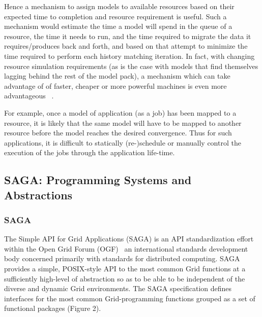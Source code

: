 \documentclass{sig-alternate}
\begin{document}
Hence a mechanism to assign models to available resources based on
their expected time to completion and resource requirement is useful.
Such a mechanism would estimate the time a model will spend in the
queue of a resource, the time it needs to run, and the time required
to migrate the data it requires/produces back and forth, and based on
that attempt to minimize the time required to perform each history
matching iteration.  In fact, with changing resource simulation
requirements (as is the case with models that find themselves lagging
behind the rest of the model pack), a mechanism which can take
advantage of of faster, cheaper or more powerful machines is even more
advantageous ~\cite{escience07}.

For example, once a model of application (as a job) has been mapped to
a resource, it is likely that the same model will have to be mapped to
another resource before the model reaches the desired convergence.
Thus for such applications, it is difficult to statically
(re-)schedule or manually control the execution of the jobs through
the application life-time.


\subsection{SAGA: Programming Systems and \\ Abstractions}


\subsubsection{SAGA}

The Simple API for Grid Applications (SAGA) is an API standardization
effort within the Open Grid Forum (OGF)~\cite{ogf_web} an
international standards development body concerned primarily with
standards for distributed computing.  SAGA provides a simple,
POSIX-style API to the most common Grid functions at a sufficiently
high-level of abstraction so as to be able to be independent of the
diverse and dynamic Grid environments. The SAGA specification defines
interfaces for the most common Grid-programming functions grouped as a
set of functional packages (Figure 2).
\end{document}
